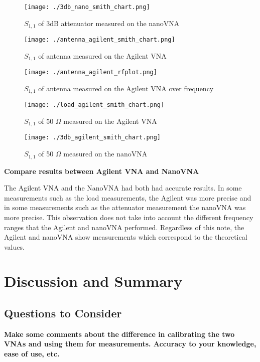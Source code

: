 \documentclass[journal]{IEEEtran}
\begin{document}
\begin{figure}[hp]
    \centering
    \texttt{[image: ./3db\_nano\_smith\_chart.png]}
    \caption{\label{fig:3db_nano} \(S_{1,1}\) of 3dB attenuator measured on the nanoVNA}
\end{figure}
\begin{figure}[hp]
    \centering
    \texttt{[image: ./antenna\_agilent\_smith\_chart.png]}
    \caption{\label{fig:attenna_agilent} \(S_{1,1}\) of antenna measured on the Agilent VNA}
\end{figure}

\begin{figure}[hp]
    \centering
    \texttt{[image: ./antenna\_agilent\_rfplot.png]}
    \caption{\label{fig:attenna_agilent_rfplot} \(S_{1,1}\) of antenna measured on the Agilent VNA over frequency}
\end{figure}

\begin{figure}[hp]
    \centering
    \texttt{[image: ./load\_agilent\_smith\_chart.png]}
    \caption{\label{fig:load_agilent} \(S_{1,1}\) of 50 \(\Omega \) measured on the Agilent VNA}
\end{figure}
\begin{figure}[hp]
    \centering
    \texttt{[image: ./3db\_agilent\_smith\_chart.png]}
    \caption{\label{fig:load_nano} \(S_{1,1}\) of 50 \(\Omega \) measured on the nanoVNA}
\end{figure}

\textbf{Compare results between Agilent VNA and NanoVNA}

The Agilent VNA and the NanoVNA had both had accurate results. In some
measurements such as the load measurements, the Agilent was more precise and in
some measurements such as the attenuator measurement the nanoVNA was more
precise. This observation does not take into account the different frequency
ranges that the Agilent and nanoVNA performed. Regardless of this note, the Agilent
and nanoVNA show measurements which correspond to the theoretical values.


\section{Discussion and Summary}

\subsection{Questions to Consider}
\textbf{Make some comments about the difference in calibrating the two VNAs and
    using them for measurements. Accuracy to your knowledge, ease of use, etc.}
\end{document}
